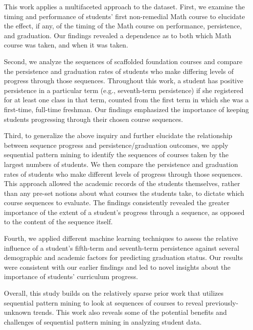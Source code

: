 \documentclass[conference]{IEEEtran}
\begin{document}
This work applies a multifaceted approach to the dataset.  First, we examine the timing and performance of students' first non-remedial Math course to elucidate the effect, if any, of the timing of the Math course on performance, persistence, and graduation. Our findings revealed a dependence as to both which Math course was taken, and when it was taken.  %

Second, we analyze the sequences of scaffolded foundation courses and compare the persistence and graduation rates of students who make differing levels of progress through those sequences.  Throughout this work, a student has positive persistence in a particular term (e.g., seventh-term persistence) if she registered for at least one class in that term, counted from the first term in which she was a first-time, full-time freshman.  Our findings emphasized the importance of keeping students progressing through their chosen course sequences.   

Third, to generalize the above inquiry and further elucidate the relationship between sequence progress and persistence/graduation outcomes, we apply sequential pattern mining to identify the sequences of courses taken by the largest numbers of students.  We then compare the persistence and graduation rates of students who make different levels of progress through those sequences. This approach allowed the academic records of the students themselves, rather than any pre-set notions about what courses the students take, to dictate which course sequences to evaluate.  The findings consistently revealed the greater importance of the extent of a student's progress through a sequence, as opposed to the content of the sequence itself.  

Fourth, we applied different machine learning techniques to assess the relative influence of a student's fifth-term and seventh-term persistence against several demographic and academic factors for predicting graduation status.  Our results were consistent with our earlier findings and led to novel insights about the importance of students' curriculum progress. 

Overall, this study builds on the relatively sparse prior work that utilizes sequential pattern mining to look at sequences of courses to reveal previously-unknown trends.  This work also reveals some of the potential benefits and challenges of sequential pattern mining in analyzing student data.
\end{document}
